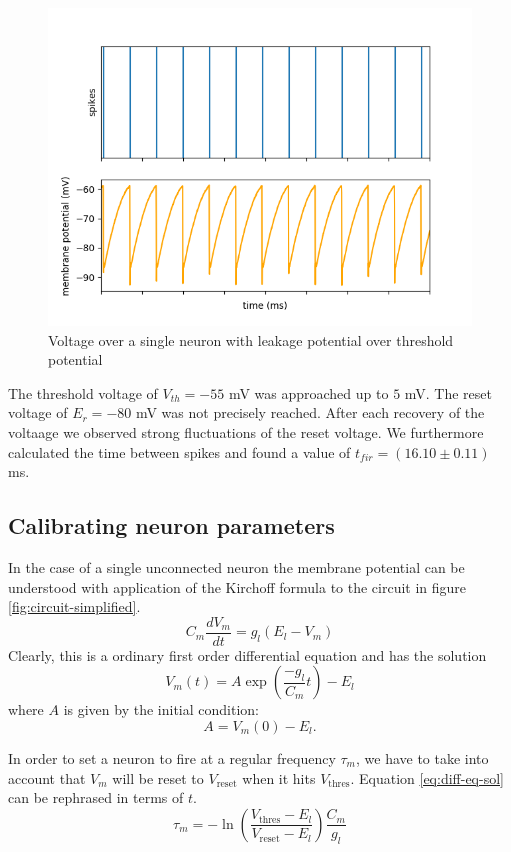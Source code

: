 \documentclass[a4paper,twocolumn]{article}
\begin{document}
\begin{figure}[ht]
    \centering
    \includegraphics[width=.5\textwidth]{figures/fp_task1_1membrane.png}
    \caption{Voltage over a single neuron with leakage potential over threshold potential}
    \label{fig:membranes_ex1}
\end{figure}

The threshold voltage of $V_{th} = -55$ mV was approached up to $5$ mV.  The reset voltage of $E_r = -80$ mV was not precisely reached.  After each recovery of the voltaage we observed strong fluctuations of the reset voltage.  We furthermore calculated the time between spikes and found a value of $t_{fir} = (16.10\pm 0.11)$ ms.
\subsection{Calibrating neuron parameters}

In the case of a single unconnected neuron the membrane potential can be
understood with application of the Kirchoff formula to the circuit in figure
\ref{fig:circuit-simplified}.
\[
    C_m \frac{dV_m}{dt} = g_l(E_l - V_m)
\]
Clearly, this is a ordinary first order differential equation and has the
solution
\begin{equation}
    V_m(t) = A \exp(\frac{-g_l}{C_m}t) - E_l
    \label{eq:diff-eq-sol}
\end{equation}
where $A$ is given by the initial condition:
\[
    A = V_m(0) - E_l.
\]

In order to set a neuron to fire at a regular frequency $\tau_m$, we have to take
into account that $V_m$ will be reset to $V_\text{reset}$ when it hits
$V_\text{thres}$. Equation \eqref{eq:diff-eq-sol} can be rephrased in terms of
$t$.
\[
    \tau_m = -\ln(\frac{V_\text{thres} - E_l}{V_\text{reset} - E_l})
    \frac{C_m}{g_l}
\]
\end{document}
